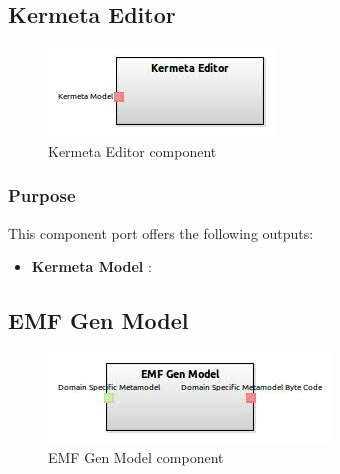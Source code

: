\documentclass{gemoc} %
\begin{document}
\subsection{Kermeta Editor}

\begin{figure}[htp]
	\begin{center}
	\includegraphics*[trim=0.0cm 0.0cm 0cm 0.0cm, clip=true, scale=1.0]{../images/generated/Generated_Kermeta Editor.jpg}
	\caption{Kermeta Editor component}
	\end{center}
\end{figure}

\subsubsection{Purpose}


This component port offers the following outputs:
\begin{itemize}
  \item \textbf{Kermeta Model} :
\end{itemize}

\subsection{EMF Gen Model}

\begin{figure}[htp]
	\begin{center}
	\includegraphics*[trim=0.0cm 0.0cm 0cm 0.0cm, clip=true, scale=1.0]{../images/generated/Generated_EMF Gen Model.jpg}
	\caption{EMF Gen Model component}
	\end{center}
\end{figure}
\end{document}
